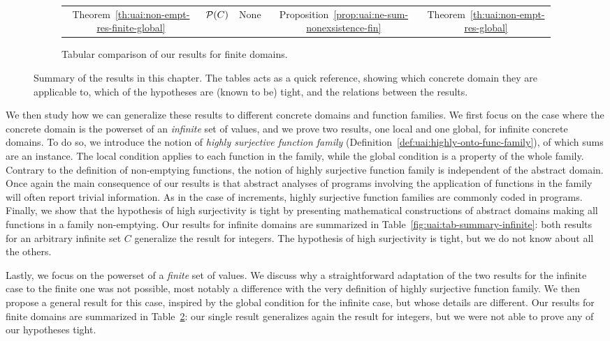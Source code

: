 \begin{figure}[t]
\begin{subfigure}{\textwidth}
{\begin{tabular}{c|cccc}
				Theorem~\ref{th:uai:non-empt-res-finite-global}     & $\mathcal{P}(C)$       & None             & Proposition~\ref{prop:uai:ne-sum-nonexsistence-fin} & Theorem~\ref{th:uai:non-empt-res-global} \\
			\end{tabular}
		}
		\caption{Tabular comparison of our results for finite domains.}
		\label{fig:uai:tab-summary-finite}
	\end{subfigure}
	\caption{Summary of the results in this chapter. The tables acts as a quick reference, showing which concrete domain they are applicable to, which of the hypotheses are (known to be) tight, and the relations between the results.}
\end{figure}

We then study how we can generalize these results to different concrete domains and function families.
We first focus on the case where the concrete domain is the powerset of an \emph{infinite} set of values, and we prove two results, one local and one global, for infinite concrete domains. To do so, we introduce the notion of \emph{highly surjective function family} (Definition~\ref{def:uai:highly-onto-func-family}), of which sums are an instance. The local condition applies to each function in the family, while the global condition is a property of the whole family. Contrary to the definition of non-emptying functions, the notion of highly surjective function family is independent of the abstract domain. Once again the main consequence of our results is that abstract analyses of programs involving the application of functions in the family will often report trivial information. As in the case of increments, highly surjective function families are commonly coded in programs.
Finally, we show that the hypothesis of high surjectivity is tight by presenting mathematical constructions of abstract domains making all functions in a family non-emptying.
Our results for infinite domains are summarized in Table~\ref{fig:uai:tab-summary-infinite}: both results for an arbitrary infinite set $C$ generalize the result for integers. The hypothesis of high surjectivity is tight, but we do not know about all the others.

Lastly, we focus on the powerset of a \emph{finite} set of values. We discuss why a straightforward adaptation of the two results for the infinite case to the finite one was not possible, most notably a difference with the very definition of highly surjective function family. We then propose a general result for this case, inspired by the global condition for the infinite case, but whose details are different.
Our results for finite domains are summarized in Table~\ref{fig:uai:tab-summary-finite}: our single result generalizes again the result for integers, but we were not able to prove any of our hypotheses tight.

